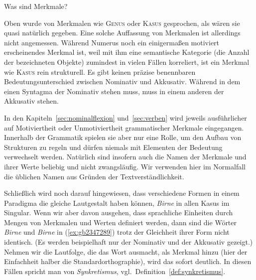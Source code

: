 \begin{Vertiefung}{Was sind Merkmale?}
  \label{vert:merkmale}

\noindent Oben wurde von Merkmalen wie \textsc{Genus} oder \textsc{Kasus} gesprochen, als wären sie quasi natürlich gegeben.
Eine solche Auffassung von Merkmalen ist allerdings nicht angemessen.
Während Numerus noch ein einigermaßen motiviert erscheinendes Merkmal ist, weil mit ihm eine semantische Kategorie (die Anzahl der bezeichneten Objekte) zumindest in vielen Fällen korreliert, ist ein Merkmal wie \textsc{Kasus} rein strukturell.
Es gibt keinen präzise benennbaren Bedeutungsunterschied zwischen Nominativ und Akkusativ.
Während in dem einen Syntagma der Nominativ stehen muss, muss in einem anderen der Akkusativ stehen.

In den Kapiteln~\ref{sec:nominalflexion} und~\ref{sec:verben} wird jeweils ausführlicher auf Motiviertheit oder Unmotiviertheit grammatischer Merkmale eingegangen.
Innerhalb der Grammatik spielen sie aber nur eine Rolle, um den Aufbau von Strukturen zu regeln und dürfen niemals mit Elementen der Bedeutung verwechselt werden.
Natürlich sind insofern auch die Namen der Merkmale und ihrer Werte beliebig und nicht zwangsläufig.
Wir verwenden hier im Normalfall die üblichen Namen aus Gründen der Textverständlichkeit.


\end{Vertiefung}

Schließlich wird noch darauf hingewiesen, dass verschiedene Formen in einem Paradigma die gleiche Lautgestalt haben können, \zB \textit{Birne} in allen Kasus im Singular.
Wenn wir aber davon ausgehen, dass sprachliche Einheiten durch Mengen von Merkmalen und Werten definiert werden, dann sind die Wörter \textit{Birne} und \textit{Birne} in (\ref{ex:gb2347289}) trotz der Gleichheit ihrer Form nicht identisch.
(Es werden beispielhaft nur der Nominativ und der Akkusativ gezeigt.)
Nehmen wir die Lautfolge, die das Wort ausmacht, als Merkmal hinzu (hier der Einfachheit halber die Standardorthographie), wird das sofort deutlich.
In diesen Fällen spricht man von \textit{Synkretismus}, vgl.\ Definition~\ref{def:synkretismus}.

\begin{exe}
  \ex\label{ex:gb2347289}
  \begin{xlist}
  \end{xlist}
\end{exe}

